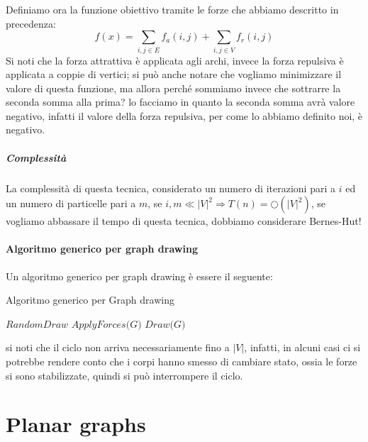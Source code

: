 \documentclass[12pt,a4paper]{article}
\begin{document}
Definiamo  ora la funzione obiettivo tramite le forze che abbiamo descritto in precedenza:
$$f(x) = \displaystyle\sum_{i,j \in E} f_a (i, j) + \displaystyle\sum_{i,j \in V} f_r (i, j)$$
Si noti che la forza attrattiva è applicata agli archi, invece la forza repulsiva è applicata a coppie di vertici; si può anche notare che vogliamo minimizzare il valore di questa funzione, ma allora perché sommiamo invece che sottrarre la seconda somma alla prima? lo facciamo in quanto la seconda somma avrà valore negativo, infatti il valore della forza repulsiva, per come lo abbiamo definito noi, è negativo.

\subsubsection{Complessità}
La complessità di questa tecnica, considerato un numero di iterazioni pari a $i$ ed un numero di particelle pari a $m$, se $i, m \ll {\vert V \vert}^2 \Rightarrow T(n) = \bigcirc({\vert V \vert}^2)$, se vogliamo abbassare il tempo di questa tecnica, dobbiamo considerare Bernes-Hut!

\subsection{Algoritmo generico per graph drawing}
Un algoritmo generico per graph drawing è essere il seguente:
\begin{algorithm}
\caption{Algoritmo generico per Graph drawing}\label{GD}
\begin{algorithmic}[1]
\State $\textit{RandomDraw}$
\State $\textit{ApplyForces(G)}$
\State $\textit{Draw(G)}$
\EndFor
\EndProcedure
\end{algorithmic}
\end{algorithm}
si noti che il ciclo non arriva necessariamente fino a $\vert V \vert$, infatti, in alcuni casi ci si potrebbe rendere conto che i corpi hanno smesso di cambiare stato, ossia le forze si sono stabilizzate, quindi si può interrompere il ciclo.

\pagebreak
\part{Planar graphs}
\end{document}
